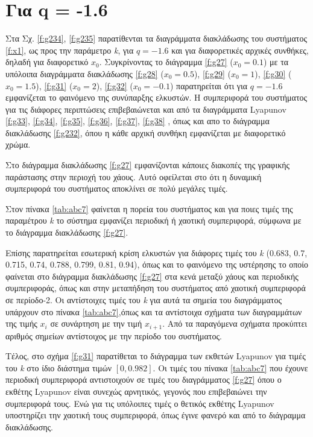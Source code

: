 \clearpage
\section{Για q = -1.6}
Στα Σχ. \ref{f:g234}, \ref{f:g235}  παρατίθενται τα διαγράμματα διακλάδωσης του συστήματος \ref{f:x1}, ως προς την παράμετρο \emph{k}, για  $q =- 1.6$ και για διαφορετικές αρχικές συνθήκες, δηλαδή για διαφορετικό \(x_0\). Συγκρίνοντας το διάγραμμα \ref{f:g27} (\(x_0=0.1\)) με τα υπόλοιπα διαγράμματα διακλάδωσης \ref{f:g28}  (\(x_0=0.5\)), \ref{f:g29}  (\(x_0=1\)), \ref{f:g30}  (\(x_0=1.5\)), \ref{f:g31}  (\(x_0=2\)), \ref{f:g32}  (\(x_0=-0.1\)) παρατηρείται ότι για $q= -1.6$ εμφανίζεται το φαινόμενο της συνύπαρξης ελκυστών. Η συμπεριφορά του συστήματος για τις διάφορες περιπτώσεις επιβεβαιώνεται και από τα διαγράμματα Lyapunov \ref{f:g33}, \ref{f:g34}, \ref{f:g35}, \ref{f:g36}, \ref{f:g37}, \ref{f:g38} , όπως και απο το διάγραμμα διακλάδωσης \ref{f:g232}, όπου η κάθε αρχική συνθήκη εμφανίζεται με διαφορετικό χρώμα.

Στο διάγραμμα διακλάδωσης \ref{f:g27} εμφανίζονται κάποιες διακοπές της γραφικής παράστασης στην περιοχή του χάους. Αυτό οφείλεται στο ότι η δυναμική συμπεριφορά του συστήματος αποκλίνει σε πολύ μεγάλες τιμές.

Στον πίνακα \ref{tab:abc7} φαίνεται η πορεία του συστήματος και για ποιες τιμές της παραμέτρου  \emph{k} το σύστημα εμφανίζει περιοδική ή χαοτική συμπεριφορά, σύμφωνα με το διάγραμμα διακλάδωσης \ref{f:g27}.

Επίσης παρατηρείται εσωτερική κρίση ελκυστών για διάφορες τιμές του \emph{k} (0.683, 0.7, 0.715, 0.74, 0.788, 0.799, 0.81, 0.94), όπως και το φαινόμενο της υστέρησης το οποίο φαίνεται στο διάγραμμα διακλάδωσης \ref{f:g27} στα κενά μεταξύ χάους και περιοδικής συμπεριφοράς, όπως και στην μεταπήδηση του συστήματος από χαοτική συμπεριφορά σε περίοδο-2. Οι αντίστοιχες τιμές του \emph{k} για αυτά τα σημεία του διαγράμματος υπάρχουν στο πίνακα \ref{tab:abc7},όπως και τα αντίστοιχα σχήματα των διαγραμμάτων της τιμής \(x_i\) σε συνάρτηση με την τιμή \(x_{i+1}\). Από τα παραγόμενα σχήματα προκύπτει αριθμός σημείων αντίστοιχος με την περίοδο του συστήματος.

Τέλος, στο σχήμα \ref{f:g31} παρατίθεται το διάγραμμα των εκθετών Lyapunov για τιμές του \emph{k} στο ίδιο διάστημα τιμών $[0, 0.982]$. Οι τιμές του πίνακα \ref{tab:abc7} που έχουνε περιοδική συμπεριφορά αντιστοιχούν σε τιμές του διαγράμματος \ref{f:g27} όπου ο εκθέτης Lyapunov είναι συνεχώς αρνητικός, γεγονός που επιβεβαιώνει την συμπεριφορά τους. Ενώ για τις υπόλοιπες τιμές ο θετικός εκθέτης Lyapunov υποστηρίζει την χαοτική τους συμπεριφορά, όπως έγινε φανερό και από το διάγραμμα διακλάδωσης.\\\\


